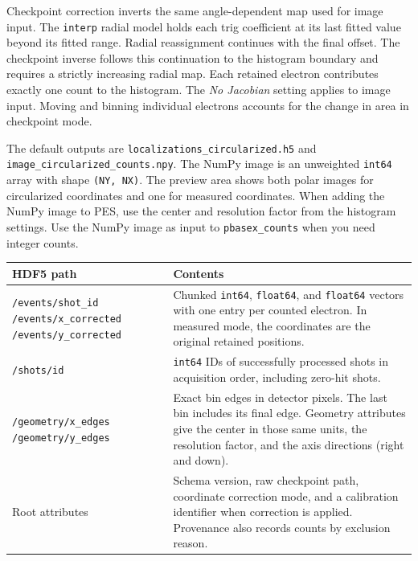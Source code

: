 \documentclass[11pt,a4paper]{article}
\newcommand{\code}[1]{\texttt{#1}}
\begin{document}
Checkpoint correction inverts the same angle-dependent map used for image
input. The \code{interp} radial model holds each trig coefficient at its last
fitted value beyond its fitted range. Radial reassignment continues with the
final offset. The checkpoint inverse follows this continuation to the
histogram boundary and requires a strictly increasing radial map. Each
retained electron contributes exactly one count to the histogram. The
\emph{No Jacobian} setting applies to image input. Moving and binning
individual electrons accounts for the change in area in checkpoint mode.

The default outputs are \code{localizations\_\allowbreak{}circularized.h5}
and \code{image\_\allowbreak{}circularized\_\allowbreak{}counts.npy}. The
NumPy image is an unweighted \code{int64} array with shape
\code{(NY, NX)}. The preview area shows both polar images for circularized
coordinates and one for measured coordinates. When adding the NumPy image
to PES, use the center and resolution factor from the histogram settings.
Use the NumPy image as input to \code{pbasex\_counts} when you need integer
counts.

\begin{center}
\footnotesize
\begin{longtable}{@{}L{5.1cm}L{10.4cm}@{}}
\toprule
HDF5 path & Contents \\
\midrule
\endhead
\bottomrule
\endfoot
\code{/events/shot\_id}\newline
\code{/events/x\_corrected}\newline
\code{/events/y\_corrected}
& Chunked \code{int64}, \code{float64}, and \code{float64} vectors with one
entry per counted electron. In measured mode, the coordinates are the
original retained positions. \\
\addlinespace
\code{/shots/id}
& \code{int64} IDs of successfully processed shots in acquisition order,
including zero-hit shots. \\
\addlinespace
\code{/geometry/x\_edges}\newline
\code{/geometry/y\_edges}
& Exact bin edges in detector pixels. The last bin includes its final
edge. Geometry attributes give the center in those same units,
the resolution factor, and the axis directions (right and down). \\
\addlinespace
Root attributes
& Schema version, raw checkpoint path, coordinate correction mode, and a
calibration identifier when correction is applied. Provenance also records
counts by exclusion reason. \\
\end{longtable}
\end{center}
\end{document}
